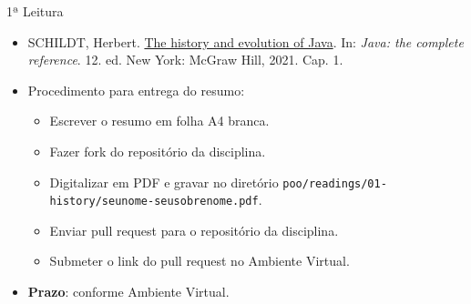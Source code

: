 \begin{frame}{1ª Leitura}
\scriptsize
\begin{itemize}
  \item SCHILDT, Herbert. \href{https://1drv.ms/b/s!Avnn2LcOmn0Y3mnfmCUIsHXeIOq5?e=jeM4eh}{The history and evolution of Java}. In: \textit{Java: the complete reference}. 12. ed. New York: McGraw Hill, 2021. Cap. 1.
  \item Procedimento para entrega do resumo:
    \begin{itemize}
      \item Escrever o resumo em folha A4 branca.
      \item Fazer fork do repositório da disciplina.
      \item Digitalizar em PDF e gravar no diretório \texttt{poo/readings/01-history/seunome-seusobrenome.pdf}.
      \item Enviar pull request para o repositório da disciplina.
      \item Submeter o link do pull request no Ambiente Virtual.
    \end{itemize}
  \item \textbf{Prazo}: conforme Ambiente Virtual.
\end{itemize}
\end{frame}

\finishLectureFile
